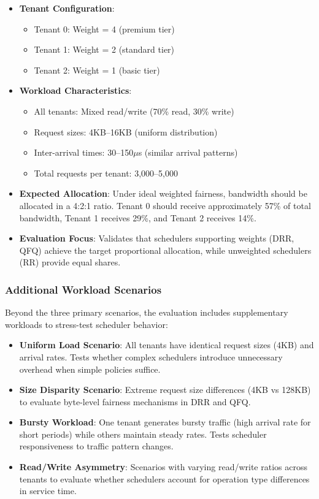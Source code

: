 \documentclass[11pt]{article}
\begin{document}
\begin{itemize}
    \item \textbf{Tenant Configuration}:
    \begin{itemize}
        \item Tenant 0: Weight = 4 (premium tier)
        \item Tenant 1: Weight = 2 (standard tier)
        \item Tenant 2: Weight = 1 (basic tier)
    \end{itemize}
    \item \textbf{Workload Characteristics}:
    \begin{itemize}
        \item All tenants: Mixed read/write (70\% read, 30\% write)
        \item Request sizes: 4KB--16KB (uniform distribution)
        \item Inter-arrival times: 30--150$\mu$s (similar arrival patterns)
        \item Total requests per tenant: 3,000--5,000
    \end{itemize}
    \item \textbf{Expected Allocation}: Under ideal weighted fairness, bandwidth should be allocated in a 4:2:1 ratio. Tenant 0 should receive approximately 57\% of total bandwidth, Tenant 1 receives 29\%, and Tenant 2 receives 14\%.
    \item \textbf{Evaluation Focus}: Validates that schedulers supporting weights (DRR, QFQ) achieve the target proportional allocation, while unweighted schedulers (RR) provide equal shares.
\end{itemize}

\subsubsection{Additional Workload Scenarios}

Beyond the three primary scenarios, the evaluation includes supplementary workloads to stress-test scheduler behavior:

\begin{itemize}
    \item \textbf{Uniform Load Scenario}: All tenants have identical request sizes (4KB) and arrival rates. Tests whether complex schedulers introduce unnecessary overhead when simple policies suffice.
    
    \item \textbf{Size Disparity Scenario}: Extreme request size differences (4KB vs 128KB) to evaluate byte-level fairness mechanisms in DRR and QFQ.
    
    \item \textbf{Bursty Workload}: One tenant generates bursty traffic (high arrival rate for short periods) while others maintain steady rates. Tests scheduler responsiveness to traffic pattern changes.
    
    \item \textbf{Read/Write Asymmetry}: Scenarios with varying read/write ratios across tenants to evaluate whether schedulers account for operation type differences in service time.
\end{itemize}
\end{document}
